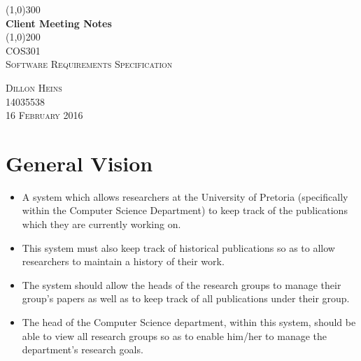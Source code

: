 \documentclass{article}
\begin{document}
\begin{titlepage}
	\begin{center}
		\line(1,0){300}\\
		[6mm]
		\huge{\bfseries Client Meeting Notes}\\
		[2mm]
		\line(1,0){200}\\
		[15mm]
		\textsc{\large COS301}\\
		[7.5mm]
		\textsc{\large Software Requirements Specification}\\
		[10cm]
	\end{center}
	
	\begin{flushright}
		\textsc{\large Dillon Heins\\
		14035538\\
		16 February 2016\\}
	\end{flushright}
\end{titlepage}

\tableofcontents
\thispagestyle{empty}
\cleardoublepage
%

\setcounter{page}{1}
%

\section{General Vision}\label{sec:vision}
	\begin{itemize}
		\item A system which allows researchers at the University of Pretoria (specifically within the Computer Science Department) to keep track of the publications which they are currently working on.
		\item This system must also keep track of historical publications so as to allow researchers to maintain a history of their work.
		\item The system should allow the heads of the research groups to manage their group's papers as well as to keep track of all publications under their group.
		\item The head of the Computer Science department, within this system, should be able to view all research groups so as to enable him/her to manage the department's research goals.
	\end{itemize}
\end{document}
